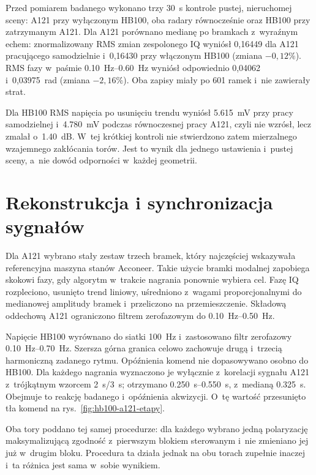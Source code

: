 \documentclass[12pt,a4paper,oneside]{report}
\begin{document}
Przed pomiarem badanego wykonano trzy \SI{30}{s} kontrole pustej, nieruchomej
sceny: A121 przy wyłączonym HB100, oba radary równocześnie oraz HB100 przy
zatrzymanym A121. Dla A121 porównano medianę po bramkach z~wyraźnym echem:
znormalizowany RMS zmian zespolonego IQ wyniósł 0,16449 dla A121 pracującego
samodzielnie i~0,16430 przy włączonym HB100 (zmiana $-0{,}12\%$). RMS fazy
w~paśmie \SIrange{0.10}{0.60}{Hz} wyniósł odpowiednio 0,04062 i~0,03975~rad
(zmiana $-2{,}16\%$). Oba zapisy miały po 601 ramek i~nie zawierały strat.

Dla HB100 RMS napięcia po usunięciu trendu wyniósł \SI{5.615}{mV} przy pracy
samodzielnej i~\SI{4.780}{mV} podczas równoczesnej pracy A121, czyli nie
wzrósł, lecz zmalał o~\SI{1.40}{dB}. W~tej krótkiej kontroli nie stwierdzono
zatem mierzalnego wzajemnego zakłócania torów. Jest to wynik dla jednego
ustawienia i~pustej sceny, a~nie dowód odporności w~każdej geometrii.

\section{Rekonstrukcja i synchronizacja sygnałów}

Dla A121 wybrano stały zestaw trzech bramek, który najczęściej wskazywała
referencyjna maszyna stanów Acconeer. Takie użycie bramki modalnej zapobiega
skokowi fazy, gdy algorytm w~trakcie nagrania ponownie wybiera cel. Fazę IQ
rozpleciono, usunięto trend liniowy, uśredniono z~wagami proporcjonalnymi do
medianowej amplitudy bramek i~przeliczono na przemieszczenie. Składową
oddechową A121 ograniczono filtrem zerofazowym do
\SIrange{0.10}{0.50}{Hz}.

Napięcie HB100 wyrównano do siatki \SI{100}{Hz} i~zastosowano filtr
zerofazowy \SIrange{0.10}{0.70}{Hz}. Szersza górna granica celowo zachowuje
drugą i~trzecią harmoniczną zadanego rytmu. Opóźnienia komend nie dopasowywano
osobno do HB100. Dla każdego nagrania wyznaczono je wyłącznie z~korelacji
sygnału A121 z~trójkątnym wzorcem \SI{2}{s}/\SI{3}{s}; otrzymano
\SIrange{0.250}{0.550}{s}, z~medianą \SI{0.325}{s}. Obejmuje to reakcję
badanego i~opóźnienia akwizycji. O~tę wartość przesunięto tła komend na
rys.~\ref{fig:hb100-a121-etapy}.

Oba tory poddano tej samej procedurze: dla każdego wybrano jedną polaryzację
maksymalizującą zgodność z~pierwszym blokiem sterowanym i~nie zmieniano jej już
w~drugim bloku. Procedura ta działa jednak na obu torach zupełnie inaczej i~ta
różnica jest sama w~sobie wynikiem.
\end{document}
